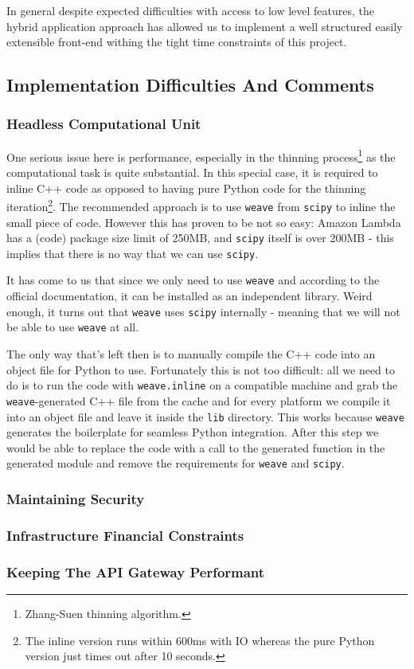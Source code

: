 In general despite expected difficulties with access to low level features, the hybrid application approach has allowed us to implement a well structured easily extensible front-end withing the tight time constraints of this project.


\subsection{Implementation Difficulties And Comments}


\subsubsection{Headless Computational Unit}

One serious issue here is performance, especially in the thinning process\footnote{Zhang-Suen thinning algorithm.} as the computational task is quite substantial. In this special case, it is required to inline C++ code as opposed to having pure Python code for the thinning iteration\footnote{The inline version runs within 600ms with IO whereas the pure Python version just times out after 10 seconds.}. The recommended approach is to use \texttt{weave} from \texttt{scipy} to inline the small piece of code. However this has proven to be not so easy: Amazon Lambda has a (code) package size limit of 250MB, and \texttt{scipy} itself is over 200MB - this implies that there is no way that we can use \texttt{scipy}.

It has come to us that since we only need to use \texttt{weave} and according to the official documentation, it can be installed as an independent library. Weird enough, it turns out that \texttt{weave} uses \texttt{scipy} internally - meaning that we will not be able to use \texttt{weave} at all.

The only way that's left then is to manually compile the C++ code into an object file for Python to use. Fortunately this is not too difficult: all we need to do is to run the code with \texttt{weave.inline} on a compatible machine and grab the \texttt{weave}-generated C++ file from the cache and for every platform we compile it into an object file and leave it inside the \texttt{lib} directory. This works because \texttt{weave} generates the boilerplate for seamless Python integration. After this step we would be able to replace the code with a call to the generated function in the generated module and remove the requirements for \texttt{weave} and \texttt{scipy}.

\subsubsection{Maintaining Security}


\subsubsection{Infrastructure Financial Constraints}


\subsubsection{Keeping The API Gateway Performant} 


